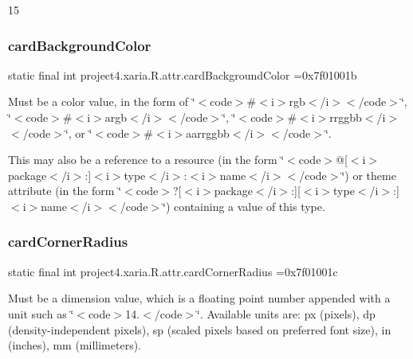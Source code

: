 15\mbox{\label{classproject4_1_1xaria_1_1R_1_1attr_aaa496716d64819ec82caf18d319ba494}} 
\subsubsection{\texorpdfstring{card\+Background\+Color}{cardBackgroundColor}}
{\footnotesize\ttfamily static final int project4.\+xaria.\+R.\+attr.\+card\+Background\+Color =0x7f01001b\hspace{0.3cm}{\ttfamily [static]}}

Must be a color value, in the form of \char`\"{}$<$code$>$\#$<$i$>$rgb$<$/i$>$$<$/code$>$\char`\"{}, \char`\"{}$<$code$>$\#$<$i$>$argb$<$/i$>$$<$/code$>$\char`\"{}, \char`\"{}$<$code$>$\#$<$i$>$rrggbb$<$/i$>$$<$/code$>$\char`\"{}, or \char`\"{}$<$code$>$\#$<$i$>$aarrggbb$<$/i$>$$<$/code$>$\char`\"{}. 

This may also be a reference to a resource (in the form \char`\"{}$<$code$>$@\mbox{[}$<$i$>$package$<$/i$>$\+:\mbox{]}$<$i$>$type$<$/i$>$\+:$<$i$>$name$<$/i$>$$<$/code$>$\char`\"{}) or theme attribute (in the form \char`\"{}$<$code$>$?\mbox{[}$<$i$>$package$<$/i$>$\+:\mbox{]}\mbox{[}$<$i$>$type$<$/i$>$\+:\mbox{]}$<$i$>$name$<$/i$>$$<$/code$>$\char`\"{}) containing a value of this type. \mbox{\label{classproject4_1_1xaria_1_1R_1_1attr_a32f29ace983f57e07e09c0f87765b221}} 
\subsubsection{\texorpdfstring{card\+Corner\+Radius}{cardCornerRadius}}
{\footnotesize\ttfamily static final int project4.\+xaria.\+R.\+attr.\+card\+Corner\+Radius =0x7f01001c\hspace{0.3cm}{\ttfamily [static]}}

Must be a dimension value, which is a floating point number appended with a unit such as \char`\"{}$<$code$>$14.\+5sp$<$/code$>$\char`\"{}. Available units are\+: px (pixels), dp (density-\/independent pixels), sp (scaled pixels based on preferred font size), in (inches), mm (millimeters). 

